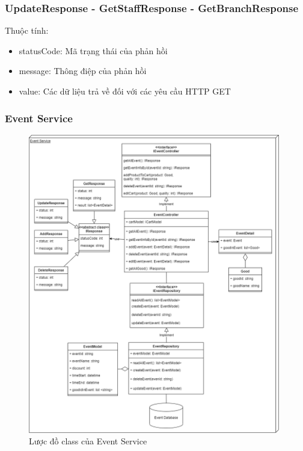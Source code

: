 \subsubsection*{UpdateResponse - GetStaffResponse - GetBranchResponse }
Thuộc tính:
\begin{itemize}
	\item statusCode: Mã trạng thái của phản hồi
	\item message: Thông điệp của phản hồi
	\item value: Các dữ liệu trả về đối với các yêu cầu HTTP GET
\end{itemize}



\subsubsection{Event Service}
\begin{figure}[!htp]
	\centering
	\includegraphics[width=11cm]{img/Architecture/service/EventService.png}
	\newline
	\caption{Lược đồ class của Event Service}
\end{figure}


